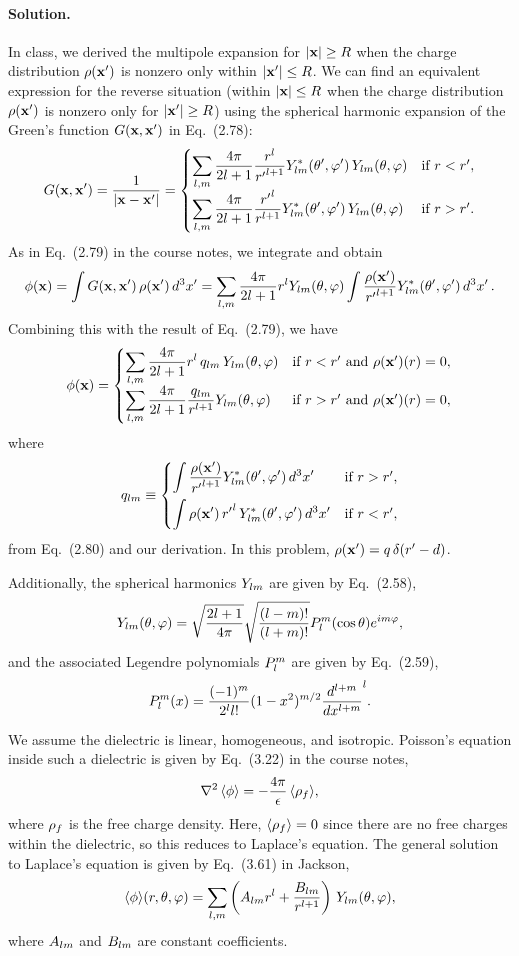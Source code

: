 \documentclass[11pt]{article}
\newcommand{\beq}{\begin{equation*}}
\newcommand{\eeq}{\end{equation*}}
\newcommand{\beqn}{\begin{equation}}
\newcommand{\eeqn}{\end{equation}}
\newenvironment{solution}
{
    \paragraph{Solution.}
    \ignorespaces
}
{
    \bigskip
}
\begin{document}
\begin{solution}
	In class, we derived the multipole expansion for $\abs{\vb{x}} \geq R$ when the charge distribution $\rho(\vb{x}')$ is nonzero only within $\abs{\vb{x}'} \leq R$.  We can find an equivalent expression for the reverse situation (within $\abs{\vb{x}} \leq R$ when the charge distribution $\rho(\vb{x}')$ is nonzero only for $\abs{\vb{x}'} \geq R$) using the spherical harmonic expansion of the Green's function $G(\vb{x}, \vb{x}')$ in Eq.~(2.78):
	\beqn \label{greenexp}
		\Gxxp = \frac{1}{\abs{\vx - \vx'}}
		= \begin{cases} \displaystyle \sum_{l,m} \dfrac{4\pi}{2l + 1} \dfrac{r^l}{{r'}^{l + 1}} \Ylm^*\tvp \, \Ylm\tv & \tif r < r', \\[2ex]
		\displaystyle \sum_{l,m} \dfrac{4\pi}{2l + 1} \dfrac{{r'}^l}{r^{l + 1}} \Ylm^*\tvp \, \Ylm\tv & \tif r > r'. \end{cases}
	\eeqn
	As in Eq.~(2.79) in the course notes, we integrate and obtain
	\beq
		\phix = \int \Gxxp \, \rhoxp \dcxp
		= \sum_{l, m} \frac{4\pi}{2l + 1} r^l \Ylm\tv \int \frac{\rhoxp}{{r'}^{l+1}} \Ylm^*\tvp \dcxp.
	\eeq
	Combining this with the result of Eq.~(2.79), we have
	\beqn \label{multipole}
		\phix = \begin{cases}\displaystyle \sum_{l, m} \dfrac{4\pi}{2l + 1} r^l \, \qlm \, \Ylm\tv & \tif r < r' \text{ and } \rhoxp(r) = 0, \\[2ex]
		\displaystyle \sum_{l,m} \dfrac{4\pi}{2l + 1} \dfrac{\qlm}{r^{l+1}} \Ylm\tv & \tif r > r' \text{ and } \rhoxp(r) = 0, \end{cases}
	\eeqn
	where
	\beqn \label{qlm}
		\qlm \equiv \begin{cases} \displaystyle \int \frac{\rhoxp}{{r'}^{l+1}} \Ylm^*\tvp \dcxp & \tif r > r', \\[2ex]
		\displaystyle \int \rhoxp \, {r'}^l \, \Ylm^*\tvp \dcxp & \tif r < r', \end{cases}
	\eeqn
	from Eq.~(2.80) and our derivation.  In this problem, $\rho(\vb{x}') = q \,\delta(r' - d)$.
	
	Additionally, the spherical harmonics $Y_{l m}$ are given by Eq.~(2.58),
	\beq
		\Ylm\tv = \sqrt{\frac{2l + 1}{4\pi}} \sqrt{\frac{(l - m)!}{(l + m)!}} \Plm(\cost) e^{i m \vph},
	\eeq
	and the associated Legendre polynomials $P_l^m$ are given by Eq.~(2.59),
	\beq
		\Plm(x) = \frac{(-1)^m}{2^l l!} (1 - x^2)^{m/2} \dv[l + m]{}{x} (x^2 - 1)^l.
	\eeq	
	
	We assume the dielectric is linear, homogeneous, and isotropic.  Poisson's equation inside such a dielectric is given by Eq.~(3.22) in the course notes,
	\beq
		\lap\evphi = -\frac{4\pi}{\eps} \evrhof\!,
	\eeq
	where $\rho_f$ is the free charge density.  Here, $\evrhof = 0$ since there are no free charges within the dielectric, so this reduces to Laplace's equation.  The general solution to Laplace's equation is given by Eq.~(3.61) in Jackson,
	\beqn \label{lapsol}
		\evphi\!(r, \tht, \vph) = \sum_{l,m} \left( \Alm r^l + \frac{\Blm}{r^{l+1}} \right) \, \Ylm\tv,
	\eeqn
	where $A_{l m}$ and $B_{l m}$ are constant coefficients.
	

\end{solution}
\end{document}

